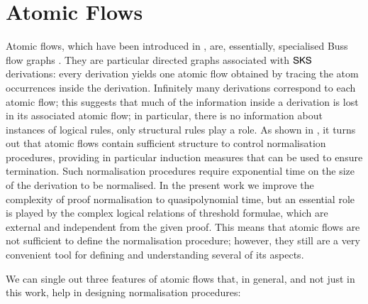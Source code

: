 \documentclass[a4paper]{amsart}
\theoremstyle{definition}
\theoremstyle{remark}
\begin{document}
\section{Atomic Flows}\label{SectAF}

Atomic flows, which have been introduced in \cite{GuglGund:07:Normalis:lr}, are, essentially, specialised Buss flow graphs \cite{Buss:91:The-Unde:uq}. They are particular directed graphs associated with $\mathsf{SKS}$ derivations: every derivation yields one atomic flow obtained by tracing the atom occurrences inside the derivation. Infinitely many derivations correspond to each atomic flow; this suggests that much of the information inside a derivation is lost in its associated atomic flow; in particular, there is no information about instances of logical rules, only structural rules play a role. As shown in \cite{GuglGund:07:Normalis:lr}, it turns out that atomic flows contain sufficient structure to control normalisation procedures, providing in particular induction measures that can be used to ensure termination. Such normalisation procedures require exponential time on the size of the derivation to be normalised. In the present work we improve the complexity of proof normalisation to quasipolynomial time, but an essential role is played by the complex logical relations of threshold formulae, which are external and independent from the given proof. This means that atomic flows are not sufficient to define the normalisation procedure; however, they still are a very convenient tool for defining and understanding several of its aspects.

We can single out three features of atomic flows that, in general, and not just in this work, help in designing normalisation procedures:
\end{document}
